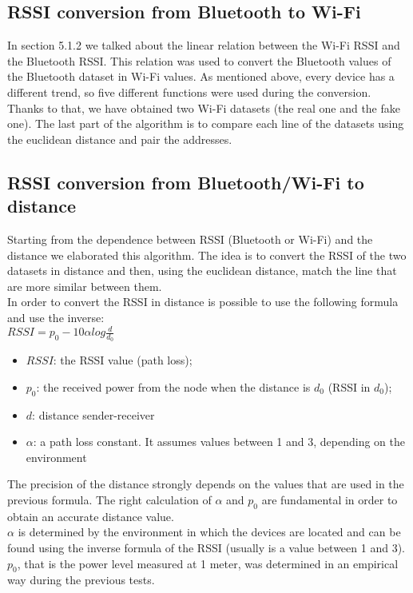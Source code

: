 \subsection{RSSI conversion from Bluetooth to Wi-Fi}
In section 5.1.2 we talked about the linear relation between the Wi-Fi RSSI and the Bluetooth RSSI. This relation was used to convert the Bluetooth values of the Bluetooth dataset in Wi-Fi values. As mentioned above, every device has a different trend, so five different functions were used during the conversion.\\
Thanks to that, we have obtained two Wi-Fi datasets (the real one and the fake one). The last part of the algorithm is to compare each line of the datasets using the euclidean distance and pair the addresses.

\subsection{RSSI conversion from Bluetooth/Wi-Fi to distance}
Starting from the dependence between RSSI (Bluetooth or Wi-Fi) and the distance we elaborated this algorithm. The idea is to convert the RSSI of the two datasets in distance and then, using the euclidean distance, match the line that are more similar between them.\\
\linebreak
In order to convert the RSSI in distance is possible to use the following formula and use the inverse:\\
\(RSSI = p_0 - 10 \alpha log{\frac{d}{d_0}}\)\\
\begin{itemize}
\item \(RSSI\): the RSSI value (path loss);
\item \(p_0\): the received power from the node when the distance is \(d_0\) (RSSI in \(d_0\));
\item \(d\): distance sender-receiver
\item \(\alpha\): a path loss constant. It assumes values between 1 and 3, depending on the environment
\end{itemize}
The precision of the distance strongly depends on the values that are used in the previous formula. The right calculation of \(\alpha\) and \(p_0\) are fundamental in order to obtain an accurate distance value.\\
\(\alpha\) is determined by the environment in which the devices are located and can be found using the inverse formula of the RSSI (usually is a value between 1 and 3). \(p_0\), that is the power level measured at 1 meter, was determined in an empirical way during the previous tests.\\
